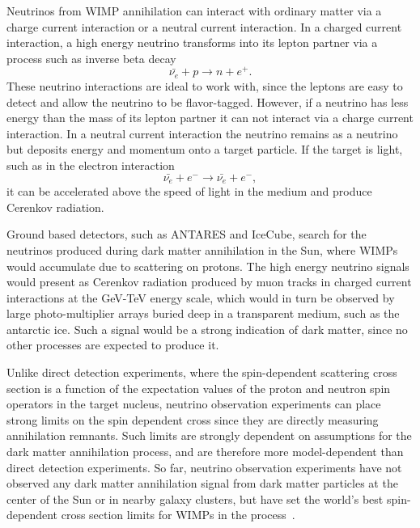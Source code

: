 Neutrinos from WIMP annihilation can interact with ordinary matter via a charge current interaction or a neutral current interaction.  In a charged current interaction, a high energy neutrino transforms into its lepton partner via a process such as inverse beta decay
\begin{equation}
\bar{\nu_e} + p \rightarrow n + e^+ .
\end{equation}
These neutrino interactions are ideal to work with, since the leptons are easy to detect and allow the neutrino to be flavor-tagged.  However, if a neutrino has less energy than the mass of its lepton partner it can not interact via a charge current interaction.  In a neutral current interaction the neutrino remains as a neutrino but deposits energy and momentum onto a target particle.  If the target is light, such as in the electron interaction
\begin{equation}
\bar{\nu_e} + e^- \rightarrow \bar{\nu_e} + e^- ,
\end{equation}
it can be accelerated above the speed of light in the medium and produce Cerenkov radiation.  

Ground based detectors, such as ANTARES and IceCube, search for the neutrinos produced during dark matter annihilation in the Sun, where WIMPs would accumulate due to scattering on protons.  The high energy neutrino signals would present as Cerenkov radiation produced by muon tracks in charged current interactions at the GeV-TeV energy scale, which would in turn be observed by large photo-multiplier arrays buried deep in a transparent medium, such as the antarctic ice.  Such a signal would be a strong indication of dark matter, since no other processes are expected to produce it.  

Unlike direct detection experiments, where the spin-dependent scattering cross section is a function of the  expectation values of the proton and neutron spin operators in the target nucleus, neutrino observation experiments can place strong limits on the spin dependent cross since they are directly measuring annihilation remnants.  Such limits are strongly dependent on assumptions for the dark matter annihilation process, and are therefore more model-dependent than direct detection experiments.  So far, neutrino observation experiments have not observed any dark matter annihilation signal from dark matter particles at the center of the Sun or in nearby galaxy clusters, but have set the world's best spin-dependent cross section limits for WIMPs in the process~\cite{IceCube, IceCube2}.

